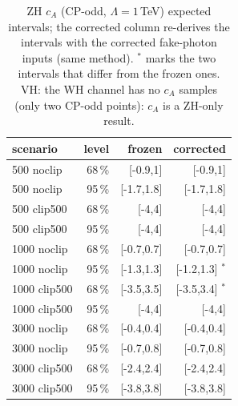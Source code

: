 \begin{table}[ht]\centering\small
\begin{tabular}{lrrr}\hline
scenario & level & frozen & corrected \\\hline
500 noclip & 68\,\% & [-0.9,1] & [-0.9,1] \\
500 noclip & 95\,\% & [-1.7,1.8] & [-1.7,1.8] \\
500 clip500 & 68\,\% & [-4,4] & [-4,4] \\
500 clip500 & 95\,\% & [-4,4] & [-4,4] \\
1000 noclip & 68\,\% & [-0.7,0.7] & [-0.7,0.7] \\
1000 noclip & 95\,\% & [-1.3,1.3] & [-1.2,1.3] $^*$ \\
1000 clip500 & 68\,\% & [-3.5,3.5] & [-3.5,3.4] $^*$ \\
1000 clip500 & 95\,\% & [-4,4] & [-4,4] \\
3000 noclip & 68\,\% & [-0.4,0.4] & [-0.4,0.4] \\
3000 noclip & 95\,\% & [-0.7,0.8] & [-0.7,0.8] \\
3000 clip500 & 68\,\% & [-2.4,2.4] & [-2.4,2.4] \\
3000 clip500 & 95\,\% & [-3.8,3.8] & [-3.8,3.8] \\\hline
\end{tabular}
\caption{ZH $c_A$ (CP-odd, $\Lambda=1$\,TeV) expected intervals; the corrected column re-derives the intervals with the corrected fake-photon inputs (same method). $^*$ marks the two intervals that differ from the frozen ones. VH: the WH channel has no $c_A$ samples (only two CP-odd points): $c_A$ is a ZH-only result.}
\end{table}
